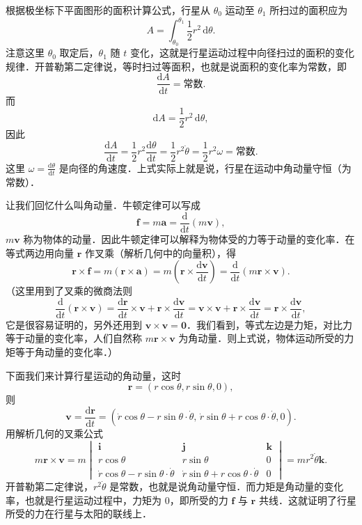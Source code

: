 根据极坐标下平面图形的面积计算公式，行星从 $\theta_0$ 运动至 $\theta_1$ 所扫过的面积应为
\[
A = \int_{\theta_0}^{\theta_1}\frac{1}{2}r^2\,\mathrm{d}\theta.
\]
注意这里 $\theta_0$ 取定后，$\theta_1$ 随 $t$ 变化，这就是行星运动过程中向径扫过的面积的变化规律．开普勒第二定律说，等时扫过等面积，也就是说面积的变化率为常数，即
\[
\frac{\mathrm{d}A}{\mathrm{d}t} = \text{常数}.
\]
而
\[
\mathrm{d}A = \frac{1}{2}r^2\,\mathrm{d}\theta,
\]
因此
\[
\frac{\mathrm{d}A}{\mathrm{d}t} = \frac{1}{2}r^2\frac{\mathrm{d}\theta}{\mathrm{d}t} = \frac{1}{2}r^2\dot{\theta} = \frac{1}{2}r^2\omega = \text{常数}.
\]
这里 $\omega = \frac{\mathrm{d}\theta}{\mathrm{d}t}$ 是向径的角速度．上式实际上就是说，行星在运动中角动量守恒（为常数）．

让我们回忆什么叫角动量．牛顿定律可以写成
\[
\boldsymbol{f} = m\boldsymbol{a} = \frac{\mathrm{d}}{\mathrm{d}t}(m\boldsymbol{v}),
\]
$m\boldsymbol{v}$ 称为物体的动量．因此牛顿定律可以解释为物体受的力等于动量的变化率．在等式两边用向量 $\boldsymbol{r}$ 作叉乘（解析几何中的向量积），得
\[
\boldsymbol{r}\times\boldsymbol{f} = m(\boldsymbol{r}\times\boldsymbol{a}) = m\left(\boldsymbol{r}\times\frac{\mathrm{d}\boldsymbol{v}}{\mathrm{d}t}\right) = \frac{\mathrm{d}}{\mathrm{d}t}(m\boldsymbol{r}\times\boldsymbol{v}).
\]
（这里用到了叉乘的微商法则
\[
\frac{\mathrm{d}}{\mathrm{d}t}(\boldsymbol{r}\times\boldsymbol{v}) = \frac{\mathrm{d}\boldsymbol{r}}{\mathrm{d}t}\times\boldsymbol{v} + \boldsymbol{r}\times\frac{\mathrm{d}\boldsymbol{v}}{\mathrm{d}t} = \boldsymbol{v}\times\boldsymbol{v} + \boldsymbol{r}\times\frac{\mathrm{d}\boldsymbol{v}}{\mathrm{d}t} = \boldsymbol{r}\times\frac{\mathrm{d}\boldsymbol{v}}{\mathrm{d}t},
\]
它是很容易证明的，另外还用到 $\boldsymbol{v}\times\boldsymbol{v} = \boldsymbol{0}$．我们看到，等式左边是力矩，对比力等于动量的变化率，人们自然称 $m\boldsymbol{r}\times\boldsymbol{v}$ 为角动量．则上式说，物体运动所受的力矩等于角动量的变化率．）

下面我们来计算行星运动的角动量，这时
\[
\boldsymbol{r} = (r\cos\theta, r\sin\theta, 0),
\]
则
\[
\boldsymbol{v} = \frac{\mathrm{d}\boldsymbol{r}}{\mathrm{d}t} = (\dot{r}\cos\theta - r\sin\theta\cdot\dot{\theta},\, \dot{r}\sin\theta + r\cos\theta\cdot\dot{\theta}, 0).
\]
用解析几何的叉乘公式
\[
m\boldsymbol{r}\times\boldsymbol{v} = m\begin{vmatrix}
\boldsymbol{i} & \boldsymbol{j} & \boldsymbol{k} \\
r\cos\theta & r\sin\theta & 0 \\
\dot{r}\cos\theta - r\sin\theta\cdot\dot{\theta} & \dot{r}\sin\theta + r\cos\theta\cdot\dot{\theta} & 0
\end{vmatrix} = m r^2\dot{\theta}\boldsymbol{k}.
\]
开普勒第二定律说，$r^2\dot{\theta}$ 是常数，也就是说角动量守恒．而力矩是角动量的变化率，也就是行星运动过程中，力矩为 $0$，即所受的力 $\boldsymbol{f}$ 与 $\boldsymbol{r}$ 共线．这就证明了行星所受的力在行星与太阳的联线上．

